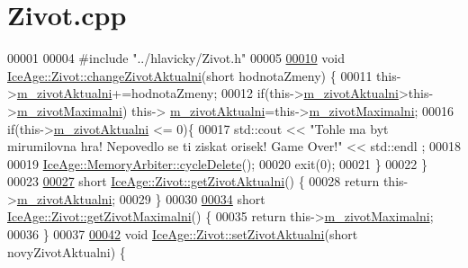 \hypertarget{Zivot_8cpp_source}{}\section{Zivot.\+cpp}
\label{Zivot_8cpp_source}

\begin{DoxyCode}
00001 
00004 \textcolor{preprocessor}{#include "../hlavicky/Zivot.h"}
00005 
\hypertarget{Zivot_8cpp_source.tex_l00010}{}\hyperlink{classIceAge_1_1Zivot_a980dc5a5af6d14c23ecca025e3ec7485}{00010} \textcolor{keywordtype}{void} \hyperlink{classIceAge_1_1Zivot_a980dc5a5af6d14c23ecca025e3ec7485}{IceAge::Zivot::changeZivotAktualni}(\textcolor{keywordtype}{short} hodnotaZmeny) \{
00011     this->\hyperlink{classIceAge_1_1Zivot_a50f8dfc33d5affeb16709ee8e5b1e445}{m\_zivotAktualni}+=hodnotaZmeny;
00012     \textcolor{keywordflow}{if}(this->\hyperlink{classIceAge_1_1Zivot_a50f8dfc33d5affeb16709ee8e5b1e445}{m\_zivotAktualni}>this->\hyperlink{classIceAge_1_1Zivot_a256134d066a2b08095fc5a5fe50ac557}{m\_zivotMaximalni}) this->
      \hyperlink{classIceAge_1_1Zivot_a50f8dfc33d5affeb16709ee8e5b1e445}{m\_zivotAktualni}=this->\hyperlink{classIceAge_1_1Zivot_a256134d066a2b08095fc5a5fe50ac557}{m\_zivotMaximalni};
00016     \textcolor{keywordflow}{if}(this->\hyperlink{classIceAge_1_1Zivot_a50f8dfc33d5affeb16709ee8e5b1e445}{m\_zivotAktualni} <= 0)\{
00017         std::cout << \textcolor{stringliteral}{"Tohle ma byt mirumilovna hra! Nepovedlo se ti ziskat orisek! Game Over!"} << std::endl
      ;
00018 
00019         \hyperlink{classIceAge_1_1MemoryArbiter_ae3460492678cf992629f4a70de3ef1ca}{IceAge::MemoryArbiter::cycleDelete}();
00020         exit(0);
00021     \}
00022 \}
00023 
\hypertarget{Zivot_8cpp_source.tex_l00027}{}\hyperlink{classIceAge_1_1Zivot_ae4e3a167722a80ccace3985f183ddd8d}{00027} \textcolor{keywordtype}{short} \hyperlink{classIceAge_1_1Zivot_ae4e3a167722a80ccace3985f183ddd8d}{IceAge::Zivot::getZivotAktualni}() \{
00028     \textcolor{keywordflow}{return} this->\hyperlink{classIceAge_1_1Zivot_a50f8dfc33d5affeb16709ee8e5b1e445}{m\_zivotAktualni};
00029 \}
00030 
\hypertarget{Zivot_8cpp_source.tex_l00034}{}\hyperlink{classIceAge_1_1Zivot_a75a65879dd6ddc0bc3e402ac6f613813}{00034} \textcolor{keywordtype}{short} \hyperlink{classIceAge_1_1Zivot_a75a65879dd6ddc0bc3e402ac6f613813}{IceAge::Zivot::getZivotMaximalni}() \{
00035     \textcolor{keywordflow}{return} this->\hyperlink{classIceAge_1_1Zivot_a256134d066a2b08095fc5a5fe50ac557}{m\_zivotMaximalni};
00036 \}
00037 
\hypertarget{Zivot_8cpp_source.tex_l00042}{}\hyperlink{classIceAge_1_1Zivot_ac09b749a9007fb4a02ea9d7f5000627c}{00042} \textcolor{keywordtype}{void} \hyperlink{classIceAge_1_1Zivot_ac09b749a9007fb4a02ea9d7f5000627c}{IceAge::Zivot::setZivotAktualni}(\textcolor{keywordtype}{short} novyZivotAktualni) \{

\end{DoxyCode}
